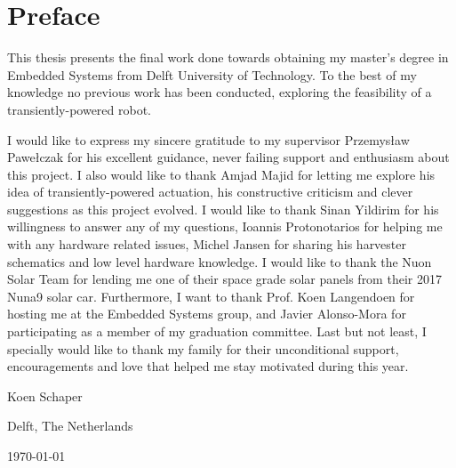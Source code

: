 \chapter*{Preface}

This thesis presents the final work done towards obtaining my master’s degree in Embedded Systems from Delft University of Technology.
To the best of my knowledge no previous work has been conducted, exploring the feasibility of a transiently-powered robot. 


\vspace{1\baselineskip}

\noindent
I would like to express my sincere gratitude to my supervisor Przemys\l{}aw Pawe\l{}czak for his excellent guidance, never failing support and enthusiasm about this project. 
I also would like to thank Amjad Majid for letting me explore his idea of transiently-powered actuation, his constructive criticism and clever suggestions as this project evolved.
I would like to thank Sinan Yildirim for his willingness to answer any of my questions, Ioannis Protonotarios for helping me with any hardware related issues, Michel Jansen for sharing his harvester schematics and low level hardware knowledge.
I would like to thank the Nuon Solar Team for lending me one of their space grade solar panels from their 2017 Nuna9 solar car.
Furthermore, I want to thank Prof. Koen Langendoen for hosting me at the Embedded Systems group, and Javier Alonso-Mora for participating as a member of my graduation committee.
Last but not least, I specially would like to thank my family for their unconditional support, encouragements and love that helped me stay motivated during this year.

\vspace{1\baselineskip}

\noindent
Koen Schaper

\vspace{1\baselineskip}

\noindent
Delft, The Netherlands

\noindent
\today
